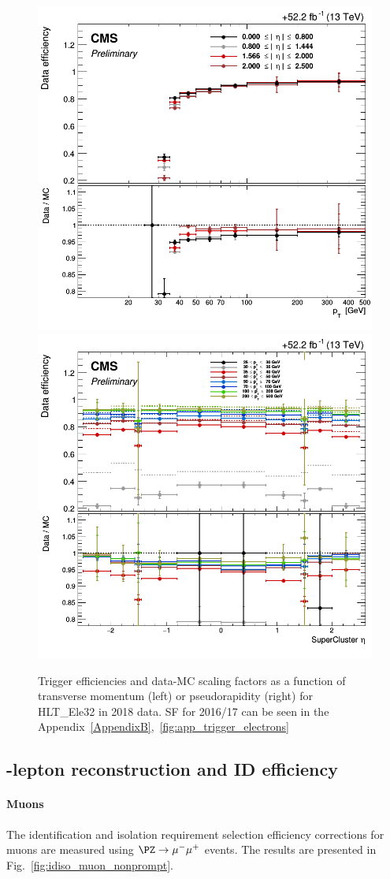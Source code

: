 \begin{figure}[h]
  \centering
  \includegraphics[width=.38\textwidth]{Figures/c6/efficiencies/trigger_electrons/2018/passEle32/leptonSF_SFvspT_passEle32.png}
\hspace{2cm}
  \includegraphics[width=.38\textwidth]{Figures/c6/efficiencies/trigger_electrons/2018/passEle32/leptonSF_SFvseta_passEle32.png}
  \caption{Trigger efficiencies and data-MC scaling factors as a function of transverse momentum (left) or pseudorapidity (right)
    for HLT\_Ele32 in 2018 data. SF for 2016/17 can be seen in the
  Appendix~\ref{AppendixB},~\ref{fig:app_trigger_electrons}
  }
  \label{fig:trigger_electrons}
\end{figure}

\subsection{\Displ-lepton reconstruction and ID efficiency} \label{sec:displeptoneff}
\paragraph{Muons}\label{sec:eff_disp_muon}
The identification and isolation requirement selection
efficiency corrections for \displ muons are measured
using $\PZ\to\mu^-\mu^+$ events. The results are presented
in Fig.~\ref{fig:idiso_muon_nonprompt}. 

